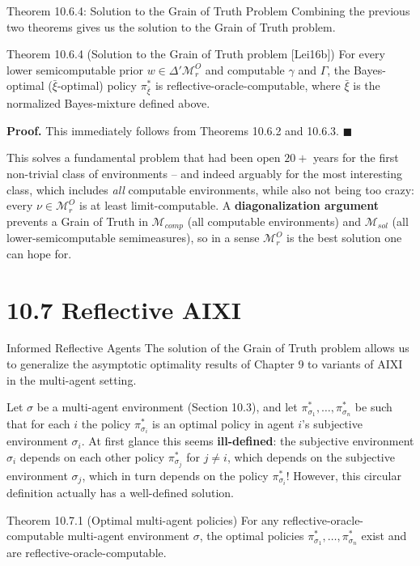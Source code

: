 \documentclass[aspectratio=169,10pt]{beamer}
\newcommand{\Mc}{\mathcal{M}}
\begin{document}
\begin{frame}{Theorem 10.6.4: Solution to the Grain of Truth Problem}
  Combining the previous two theorems gives us the solution to the Grain
  of Truth problem.
  \begin{block}{Theorem 10.6.4 (Solution to the Grain of Truth problem {\footnotesize[Lei16b]})}
    For every lower semicomputable prior $w\in\Delta'\Mc_r^O$ and
    computable $\gamma$ and $\Gamma$, the Bayes-optimal
    ($\bar\xi$-optimal) policy $\pi^*_{\bar\xi}$ is
    reflective-oracle-computable, where $\bar\xi$ is the normalized
    Bayes-mixture defined above.
  \end{block}
  \textbf{Proof.} This immediately follows from Theorems 10.6.2 and
  10.6.3. $\blacksquare$

  \vspace{0.4em}
  This solves a fundamental problem that had been open $20+$ years for the
  first non-trivial class of environments -- and indeed arguably for the
  most interesting class, which includes \emph{all} computable
  environments, while also not being too crazy: every $\nu\in\Mc_r^O$ is
  at least limit-computable. A \textbf{diagonalization argument} prevents
  a Grain of Truth in $\Mc_{comp}$ (all computable environments) and
  $\Mc_{sol}$ (all lower-semicomputable semimeasures), so in a sense
  $\Mc_r^O$ is the best solution one can hope for.
\end{frame}

\section{10.7 Reflective AIXI}

\begin{frame}{Informed Reflective Agents}
  The solution of the Grain of Truth problem allows us to generalize the
  asymptotic optimality results of Chapter 9 to variants of AIXI in the
  multi-agent setting.

  \vspace{0.3em}
  Let $\sigma$ be a multi-agent environment (Section 10.3), and let
  $\pi^*_{\sigma_1},\ldots,\pi^*_{\sigma_n}$ be such that for each $i$ the
  policy $\pi^*_{\sigma_i}$ is an optimal policy in agent $i$'s subjective
  environment $\sigma_i$. At first glance this seems \textbf{ill-defined}:
  the subjective environment $\sigma_i$ depends on each other policy
  $\pi^*_{\sigma_j}$ for $j\neq i$, which depends on the subjective
  environment $\sigma_j$, which in turn depends on the policy
  $\pi^*_{\sigma_i}$! However, this circular definition actually has a
  well-defined solution.
  \begin{block}{Theorem 10.7.1 (Optimal multi-agent policies)}
    For any reflective-oracle-computable multi-agent environment $\sigma$,
    the optimal policies $\pi^*_{\sigma_1},\ldots,\pi^*_{\sigma_n}$ exist
    and are reflective-oracle-computable.
  \end{block}
\end{frame}
\end{document}
